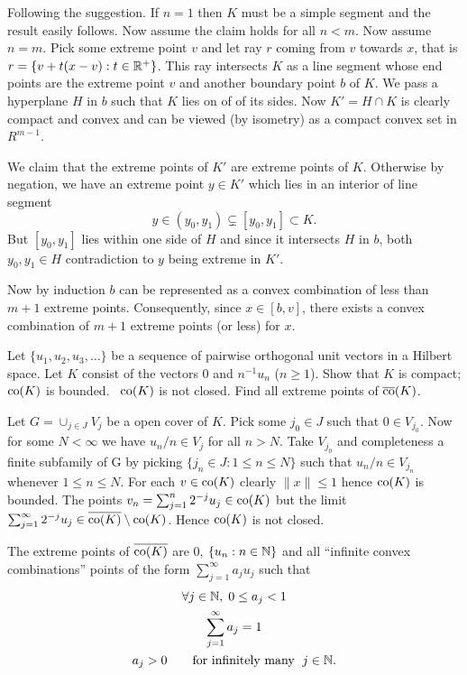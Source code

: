 \begin{enumerate}
Following the suggestion. If \(n=1\) then $K$ must be a simple segment
and the result easily follows. Now assume the claim holds for all \(n < m\).
Now assume \(n=m\). Pick some extreme point $v$ and let ray $r$ coming from $v$
towards $x$, that is \(r=\{v + t(x-v): t\in\mathbb{R}^+\}\).
This ray intersects $K$ as a line segment whose end points are
the extreme point $v$ and another boundary point $b$ of $K$.
We pass a hyperplane $H$ in $b$ such that $K$ lies on of of its sides.
Now \(K' = H \cap K\) is clearly compact and convex and can be viewed
(by isometry) as a compact convex set in \(R^{m-1}\).

We claim that the extreme points of \(K'\) are extreme points of $K$.
Otherwise by negation, we have an extreme point \(y \in K'\) which lies in
an interior of line segment
\begin{equation*}
y \in (y_0,y_1) \subsetneq [y_0,y_1] \subset K.
\end{equation*}
But \([y_0,y_1]\) lies within one side of $H$ and since it intersects $H$
in $b$, both \(y_0,y_1 \in H\) contradiction to $y$ being extreme in \(K'\).

Now by induction $b$ can be represented as a convex combination
of less than \(m+1\) extreme points. Consequently, since \(x \in [b,v]\),
there exists a convex combination of
\(m+1\) extreme points (or less) for $x$.

\begin{excopy}
Let \(\{u_1, u_2, u_3,\ldots\}\) be a sequence of pairwise orthogonal unit
vectors in a Hilbert space.
Let $K$ consist of the vectors $0$ and \(n^{-1}u_n\) (\(n\geq 1\)).
Show that
 $K$ is compact;
 \(\mathop{\rm co}\nolimits(K)\) is bounded.
~\(\mathop{\rm co}\nolimits(K)\) is not closed.
Find all extreme points of \(\overline{\mathop{\rm co}\nolimits}(K)\).
\end{excopy}

\begin{itemize}
Let \(G = \cup_{j\in J}V_j\) be a open cover of $K$.
Pick some \(j_0\in J\) such that \(0\in V_{j_0}\).
Now for some \(N<\infty\) we have \(u_n/n \in V_j\) for all \(n > N\).
Take \(V_{j_0}\) and completeness a finite subfamily of G by picking
\(\{j_n\in J: 1\leq n \leq N\}\) such that \(u_n/n \in V_{j_n}\)
whenever \(1\leq n \leq N\).
For each \(v\in \mathop{\rm co}\nolimits(K)\) clearly \(\|x\|\leq 1\) hence \(\mathop{\rm co}\nolimits(K)\) is bounded.
The points \(v_n = \sum_{j=1}^n 2^{-j}u_j \in \mathop{\rm co}\nolimits(K)\)
but the limit
   \(\sum_{j=1}^\infty 2^{-j}u_j \in \overline{\mathop{\rm co}\nolimits(K)} \setminus \mathop{\rm co}\nolimits(K)\).
Hence \(\mathop{\rm co}\nolimits(K)\) is not closed.
\end{itemize}
The extreme points of \(\overline{\mathop{\rm co}\nolimits(K)}\) are $0$, \(\{u_n:n\in\mathbb{N}\}\)
and all ``infinite convex combinations'' points of the form
\(\sum_{j=1}^\infty a_j u_j\) such that
\begin{gather*}
\forall j\in\mathbb{N},\;0 \leq a_j < 1 \\
\sum_{j=1}^\infty a_j = 1\\
a_j > 0 \qquad \textnormal{for infinitely many }\; j\in\mathbb{N}.
\end{gather*}



\end{enumerate}
